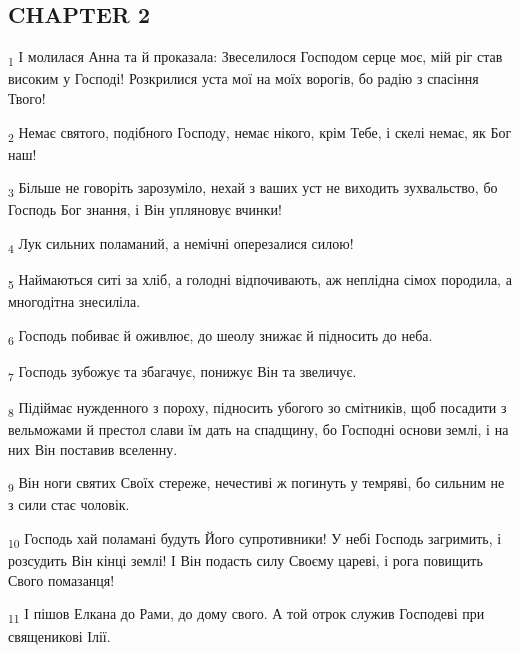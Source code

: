 \subsection{CHAPTER 2}
\begin{tcolorbox}
\textsubscript{1} І молилася Анна та й проказала: Звеселилося Господом серце моє, мій ріг став високим у Господі! Розкрилися уста мої на моїх ворогів, бо радію з спасіння Твого!
\end{tcolorbox}
\begin{tcolorbox}
\textsubscript{2} Немає святого, подібного Господу, немає нікого, крім Тебе, і скелі немає, як Бог наш!
\end{tcolorbox}
\begin{tcolorbox}
\textsubscript{3} Більше не говоріть зарозуміло, нехай з ваших уст не виходить зухвальство, бо Господь Бог знання, і Він упляновує вчинки!
\end{tcolorbox}
\begin{tcolorbox}
\textsubscript{4} Лук сильних поламаний, а немічні оперезалися силою!
\end{tcolorbox}
\begin{tcolorbox}
\textsubscript{5} Наймаються ситі за хліб, а голодні відпочивають, аж неплідна сімох породила, а многодітна знесиліла.
\end{tcolorbox}
\begin{tcolorbox}
\textsubscript{6} Господь побиває й оживлює, до шеолу знижає й підносить до неба.
\end{tcolorbox}
\begin{tcolorbox}
\textsubscript{7} Господь зубожує та збагачує, понижує Він та звеличує.
\end{tcolorbox}
\begin{tcolorbox}
\textsubscript{8} Підіймає нужденного з пороху, підносить убогого зо смітників, щоб посадити з вельможами й престол слави їм дать на спадщину, бо Господні основи землі, і на них Він поставив вселенну.
\end{tcolorbox}
\begin{tcolorbox}
\textsubscript{9} Він ноги святих Своїх стереже, нечестиві ж погинуть у темряві, бо сильним не з сили стає чоловік.
\end{tcolorbox}
\begin{tcolorbox}
\textsubscript{10} Господь хай поламані будуть Його супротивники! У небі Господь загримить, і розсудить Він кінці землі! І Він подасть силу Своєму цареві, і рога повищить Свого помазанця!
\end{tcolorbox}
\begin{tcolorbox}
\textsubscript{11} І пішов Елкана до Рами, до дому свого. А той отрок служив Господеві при священикові Ілії.
\end{tcolorbox}
